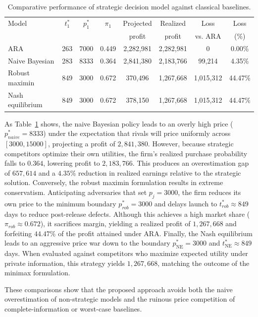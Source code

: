 \documentclass[a4paper,fleqn, 11pt]{cas-sc}
\begin{document}
\begin{table}[htbp]
\centering
\begin{tabular}{l|cc|c|cc|cc}
\hline
Model & $t_1^*$ & $p_1^*$ & $\pi_1$ & Projected & Realized & Loss & Loss \\
 & & & & profit & profit & vs. ARA & (\%) \\
\hline
ARA & 263 & 7000 & 0.449 & 2,282,981 & 2,282,981 & 0 & 0.00\% \\
Naive Bayesian & 283 & 8333 & 0.364 & 2,841,380 & 2,183,766 & 99,214 & 4.35\% \\
Robust maximin & 849 & 3000 & 0.672 & 370,496 & 1,267,668 & 1,015,312 & 44.47\% \\
Nash equilibrium & 849 & 3000 & 0.672 & 378,150 & 1,267,668 & 1,015,312 & 44.47\% \\
\hline
\end{tabular}
\caption{Comparative performance of strategic decision model against classical baselines.}
\label{tab:benchmarks}
\end{table}

As Table~\ref{tab:benchmarks} shows, the naive Bayesian policy leads to an overly high price ($p_{naive}^* = 8333$) under the expectation that rivals will price uniformly across $[3000, 15000]$, projecting a profit of $2,841,380$. However, because strategic competitors optimize their own utilities, the firm's realized purchase probability falls to $0.364$, lowering profit to $2,183,766$. This produces an overestimation gap of $657,614$ and a $4.35\%$ reduction in realized earnings relative to the strategic solution.
%
Conversely, the robust maximin formulation results in extreme conservatism. Anticipating adversaries that set $p_j = 3000$, the firm reduces its own price to the minimum boundary $p_{rob}^* = 3000$ and delays launch to $t_{rob}^* \approx 849$ days to reduce post-release defects. Although this achieves a high market share ($\pi_{rob} \approx 0.672$), it sacrifices margin, yielding a realized profit of $1,267,668$ and forfeiting $44.47\%$ of the profit attained under ARA.
%
Finally, the Nash equilibrium leads to an aggressive price war down to the boundary $p_{\text{NE}}^* = 3000$ and $t_{\text{NE}}^* \approx 849$ days. When evaluated against competitors who maximize expected utility under private information, this strategy yields $1,267,668$, matching the outcome of the minimax formulation. 

These comparisons show that the proposed approach avoids both the naive overestimation of non-strategic models and the ruinous price competition of complete-information or worst-case baselines.
\end{document}
